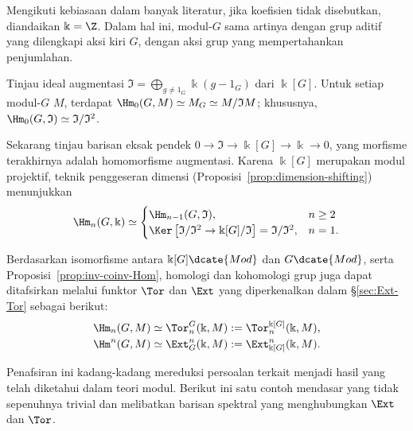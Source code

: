 Mengikuti kebiasaan dalam banyak literatur, jika koefisien tidak disebutkan,
diandaikan $\Bbbk=\Z$. Dalam hal ini, modul-$G$ sama artinya dengan grup
aditif yang dilengkapi aksi kiri $G$, dengan aksi grup yang mempertahankan
penjumlahan.

\begin{contoh}\label{eg:group-H1}
	Tinjau ideal augmentasi
	$\mathfrak{I}=\bigoplus_{g\neq1_G}\Bbbk(g-1_G)$ dari $\Bbbk[G]$. Untuk
	setiap modul-$G$ $M$, terdapat
	$\Hm_0(G,M)\simeq M_G\simeq M/\mathfrak{I}M$; khususnya,
	$\Hm_0(G,\mathfrak{I})\simeq\mathfrak{I}/\mathfrak{I}^2$.

	Sekarang tinjau barisan eksak pendek
	$0\to\mathfrak{I}\to\Bbbk[G]\to\Bbbk\to0$, yang morfisme terakhirnya
	adalah homomorfisme augmentasi. Karena $\Bbbk[G]$ merupakan modul
	projektif, teknik penggeseran dimensi
	(Proposisi~\ref{prop:dimension-shifting}) menunjukkan
	\[ \Hm_n(G, \Bbbk) \simeq \begin{cases}
		\Hm_{n-1}(G, \mathfrak{I}), & n \geq 2 \\
		\Ker\left[ \mathfrak{I}/\mathfrak{I}^2 \to \Bbbk[G]/\mathfrak{I} \right] = \mathfrak{I}/\mathfrak{I}^2 , & n = 1.
	\end{cases}\]
\end{contoh}

Berdasarkan isomorfisme antara $\Bbbk[G]\dcate{Mod}$ dan $G\dcate{Mod}$,
serta Proposisi~\ref{prop:inv-coinv-Hom}, homologi dan kohomologi grup juga
dapat ditafsirkan melalui funktor $\Tor$ dan $\Ext$ yang diperkenalkan dalam
\S\ref{sec:Ext-Tor} sebagai berikut:
\begin{equation}\label{eqn:grp-Hm-Tor-Ext}\begin{aligned}
	\Hm_n(G, M) & \simeq \Tor^G_n(\Bbbk, M) := \Tor^{\Bbbk[G]}_n(\Bbbk, M), \\
	\Hm^n(G, M) & \simeq \Ext_G^n(\Bbbk, M) := \Ext_{\Bbbk[G]}^n(\Bbbk, M).
\end{aligned}\end{equation}

Penafsiran ini kadang-kadang mereduksi persoalan terkait menjadi hasil yang
telah diketahui dalam teori modul. Berikut ini satu contoh mendasar yang
tidak sepenuhnya trivial dan melibatkan barisan spektral yang menghubungkan
$\Ext$ dan $\Tor$.

